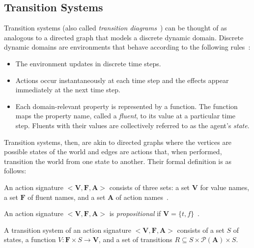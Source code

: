 \subsection{Transition Systems}
\label{subsec:transition_systems}

Transition systems (also called \textit{transition diagrams}~\citep{blount_architecture_2013}) can be thought of as analogous to a directed graph that models a discrete dynamic domain.
Discrete dynamic domains are environments that behave according to the following rules~\citep{blount_architecture_2013}:

\begin{itemize}
    \item The environment updates in discrete time steps.
    \item Actions occur instantaneously at each time step and the effects appear immediately at the next time step.
    \item Each domain-relevant property is represented by a function.
        The function maps the property name, called a \textit{fluent}, to its value at a particular time step.
        Fluents with their values are collectively referred to as the agent's \textit{state}.
\end{itemize}

Transition systems, then, are akin to directed graphs where the vertices are possible states of the world and edges are actions that, when performed, transition the world from one state to another.
Their formal definition is as follows:

\begin{definition}
    \label{def:action_signature}
    An action signature $ < \boldsymbol{V}, \boldsymbol{F}, \boldsymbol{A}> $ consists of three sets: a set $ \boldsymbol{V} $ for value names, a set $ \boldsymbol{F} $ of fluent names, and a set $ \boldsymbol{A} $ of action names~\citep{gelfond_action_1998}.
\end{definition}

\begin{definition}
    \label{def:propositional_action_signature}
    An action signature $< \boldsymbol{V}, \boldsymbol{F}, \boldsymbol{A}>$ is \textit{propositional} if $\boldsymbol{V}=\{t,f\}$~\citep{gelfond_action_1998}.
\end{definition}

\begin{definition}
    \label{def:transition_system}
    A transition system of an action signature $ < \boldsymbol{V}, \boldsymbol{F}, \boldsymbol{A}> $ consists of a set $ S $ of states, a function $ V : \boldsymbol{F} \times S\rightarrow \boldsymbol{V} $, and a set of transitions $ R \subseteq S \times \mathcal{P}(\boldsymbol{A}) \times S $.
\end{definition}

